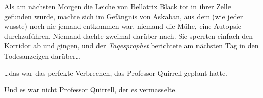 Als am nächsten Morgen die Leiche von Bellatrix Black tot in ihrer Zelle gefunden wurde, machte sich im Gefängnis von Askaban, aus dem (wie jeder wusste) noch nie jemand entkommen war, niemand die Mühe, eine Autopsie durchzuführen. Niemand dachte zweimal darüber nach. Sie sperrten einfach den Korridor ab und gingen, und der \emph{Tagesprophet} berichtete am nächsten Tag in den Todesanzeigen darüber…

…das war das perfekte Verbrechen, das Professor Quirrell geplant hatte.

Und es war nicht Professor Quirrell, der es vermasselte.
